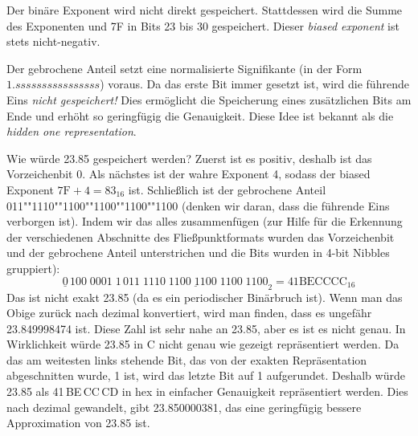 Der bin\"{a}re Exponent wird nicht direkt gespeichert. Stattdessen wird
die Summe des Exponenten und 7F in Bits 23 bis 30 gespeichert.
Dieser \emph{biased exponent}  ist stets nicht-negativ.

Der gebrochene Anteil setzt eine normalisierte Signifikante (in der
Form $1.ssssssssssssssss$) voraus. Da das erste Bit immer gesetzt
ist, wird die f\"{u}hrende Eins \emph{nicht gespeichert!} Dies
erm\"{o}glicht die Speicherung eines zus\"{a}tzlichen Bits am Ende und
erh\"{o}ht so geringf\"{u}gig die Genauigkeit. Diese Idee ist bekannt als
die \emph{hidden one representation}.

Wie w\"{u}rde 23.85 gespeichert werden? Zuerst ist es positiv, deshalb
ist das Vorzeichenbit 0. Als n\"{a}chstes ist der wahre Exponent 4,
sodass der biased Exponent $7\mathrm{F} + 4 = 83_{16}$ ist.
Schlie{\ss}lich ist der gebrochene Anteil
011""1110""1100""1100""1100""1100 (denken wir daran, dass die
f\"{u}hrende Eins verborgen ist). Indem wir das alles zusammenf\"{u}gen (zur
Hilfe f\"{u}r die Erkennung der verschiedenen Abschnitte des
Flie{\ss}punktformats wurden das Vorzeichenbit und der gebrochene Anteil
unterstrichen und die Bits wurden in 4-bit Nibbles gruppiert):
 \[ \underline{0}\,100\;0001\;1
     \,\underline{011\;1110\;1100\;1100\;1100\;1100}_2 = 41 \mathrm{BE}
 \mathrm{CC} \mathrm{CC}_{16} \]
Das ist nicht exakt 23.85 (da es ein periodischer Bin\"{a}rbruch ist).
Wenn man das Obige zur\"{u}ck nach dezimal konvertiert, wird man finden,
dass es ungef\"{a}hr 23.849998474 ist. Diese Zahl ist sehr nahe an
23.85, aber es ist es nicht genau.  In Wirklichkeit w\"{u}rde 23.85 in C nicht
genau wie gezeigt repr\"{a}sentiert werden. Da das am weitesten links
stehende Bit, das von der exakten Repr\"{a}sentation abgeschnitten
wurde, 1 ist, wird das letzte Bit auf 1 aufgerundet. Deshalb w\"{u}rde
23.85 als 41\,BE\,CC\,CD in hex in einfacher Genauigkeit
repr\"{a}sentiert werden. Dies nach dezimal gewandelt, gibt
23.850000381, das eine geringf\"{u}gig bessere Approximation von 23.85
ist.

